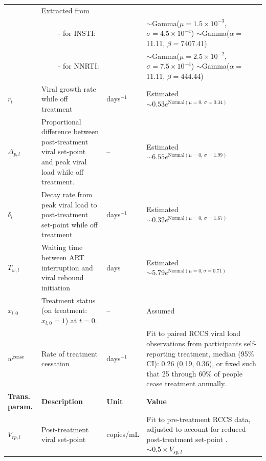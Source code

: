 \documentclass{article}[11pt]
\begin{document}
\begin{table}[hp]
\begin{tabular}{lp{}p{}L{0.30\textwidth}}
& Extracted from 
\cite{andrade2013} \\
&$\qquad$ - for INSTI: & & 
$\sim$Gamma($\mu=1.5\times10^{-3}$, $\sigma=4.5\times10^{-4}$) \newline
$\sim$Gamma($\alpha=$11.11, $\beta=$7407.41) \\
&$\qquad$ - for NNRTI: && 
$\sim$Gamma($\mu=2.5\times10^{-2}$, $\sigma=7.5\times10^{-4}$) \newline
$\sim$Gamma($\alpha=$11.11, $\beta=$444.44) \\
$r_l$ & Viral growth rate while off treatment & days$^{-1}$ &
Estimated \newline
$\sim0.53e^{\text{Normal}(\mu=0\text{, }\sigma=0.34)}$ \\
$\Delta_{p,l}$ & Proportional difference between post-treatment viral set-point and peak viral load while off treatment. & --
&
Estimated \newline
$\sim6.55e^{\text{Normal}(\mu=0\text{, }\sigma=1.99)}$ \\
$\delta_l$ & Decay rate from peak viral load to post-treatment set-point while off treatment & days$^{-1}$ &
Estimated \newline
$\sim0.32e^{\text{Normal}(\mu=0\text{, }\sigma=1.67)}$ \\
$T_{w,l}$ & Waiting time between ART interruption and viral rebound initiation & days & Estimated \newline $\sim 5.79e^{\text{Normal}(\mu=0, \sigma=0.71)}$ \\
$x_{l,0}$ & Treatment status (on treatment: $x_{l,0}=1$) at $t=0$. & --
&
Assumed  \\
$w^\text{cease}$ & Rate of treatment cessation & days$^{-1}$ &
Fit to paired RCCS viral load observations from participants self-reporting treatment, \newline
median (95\% CI): 0.26 (0.19, 0.36), \newline  or 
fixed such that 25 through 60\% \newline
of people cease treatment 
annually. \\
\midrule
\textbf{Trans. param.} & \textbf{Description} & \textbf{Unit} & \textbf{Value} \\
$V_{rp,l}$ & Post-treatment viral set-point & copies/mL &
Fit to pre-treatment RCCS data, adjusted to account for reduced post-treatment set-point . \newline
$\sim 0.5\times V_{sp,l}$ \\
\bottomrule
\end{tabular}
\label{table:simulation_parameters}
\end{table}
\end{document}
